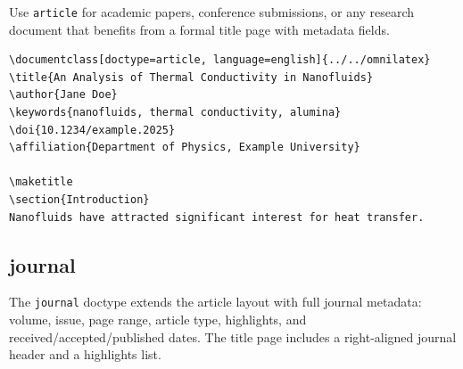 Use \texttt{article} for academic papers, conference submissions, or any
research document that benefits from a formal title page with metadata fields.

\begin{verbatim}
\documentclass[doctype=article, language=english]{../../omnilatex}
\title{An Analysis of Thermal Conductivity in Nanofluids}
\author{Jane Doe}
\keywords{nanofluids, thermal conductivity, alumina}
\doi{10.1234/example.2025}
\affiliation{Department of Physics, Example University}

\maketitle
\section{Introduction}
Nanofluids have attracted significant interest for heat transfer.

\end{verbatim}

\subsection{journal}

The \texttt{journal} doctype extends the article layout with full journal
metadata: volume, issue, page range, article type, highlights, and
received/accepted/published dates.  The title page includes a right-aligned
journal header and a highlights list.


